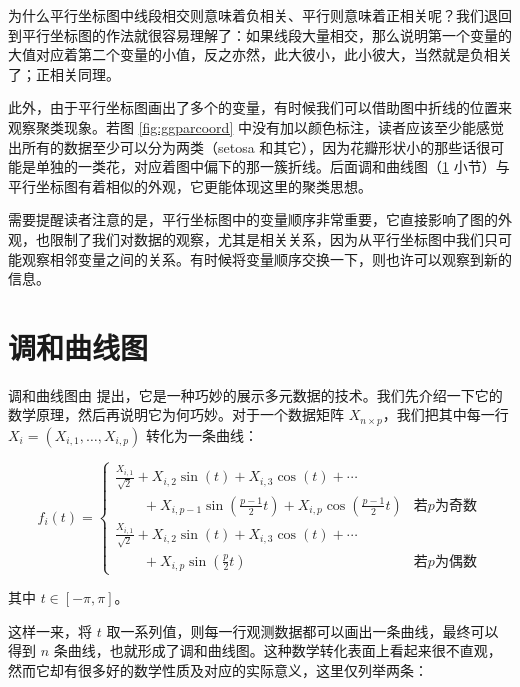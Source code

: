 \documentclass[
  b5paper,
  UTF8,twoside]{book}
\begin{document}
为什么平行坐标图中线段相交则意味着负相关、平行则意味着正相关呢？我们退回到平行坐标图的作法就很容易理解了：如果线段大量相交，那么说明第一个变量的大值对应着第二个变量的小值，反之亦然，此大彼小，此小彼大，当然就是负相关了；正相关同理。

此外，由于平行坐标图画出了多个的变量，有时候我们可以借助图中折线的位置来观察聚类现象。若图 \ref{fig:ggparcoord}
中没有加以颜色标注，读者应该至少能感觉出所有的数据至少可以分为两类（setosa 和其它），因为花瓣形状小的那些话很可能是单独的一类花，对应着图中偏下的那一簇折线。后面调和曲线图（\ref{sec:andrews-curve} 小节）与平行坐标图有着相似的外观，它更能体现这里的聚类思想。

需要提醒读者注意的是，平行坐标图中的变量顺序非常重要，它直接影响了图的外观，也限制了我们对数据的观察，尤其是相关关系，因为从平行坐标图中我们只可能观察相邻变量之间的关系。有时候将变量顺序交换一下，则也许可以观察到新的信息。

\section{调和曲线图}\label{sec:andrews-curve}

调和曲线图由 \citet{Andrews72} 提出，它是一种巧妙的展示多元数据的技术。我们先介绍一下它的数学原理，然后再说明它为何巧妙。对于一个数据矩阵 \(X_{n\times p}\)，我们把其中每一行 \(X_{i}=\left(X_{i,1},\ldots,X_{i,p}\right)\) 转化为一条曲线：

\begin{equation}
f_{i}(t)=\begin{cases}
\frac{X_{i,1}}{\sqrt{2}}+X_{i,2}\sin(t)+X_{i,3}\cos(t)+\cdots\\
\qquad+X_{i,p-1}\sin(\frac{p-1}{2}t)+X_{i,p}\cos(\frac{p-1}{2}t) & \text{若}p\text{为奇数}\\
\frac{X_{i,1}}{\sqrt{2}}+X_{i,2}\sin(t)+X_{i,3}\cos(t)+\cdots\\
\qquad+X_{i,p}\sin(\frac{p}{2}t) & \text{若}p\text{为偶数}
\end{cases} 
\label{eq:andrews-curve}
\end{equation}

其中 \(t\in[-\pi,\pi]\)。

这样一来，将 \(t\) 取一系列值，则每一行观测数据都可以画出一条曲线，最终可以得到 \(n\) 条曲线，也就形成了调和曲线图。这种数学转化表面上看起来很不直观，然而它却有很多好的数学性质及对应的实际意义，这里仅列举两条：
\end{document}
